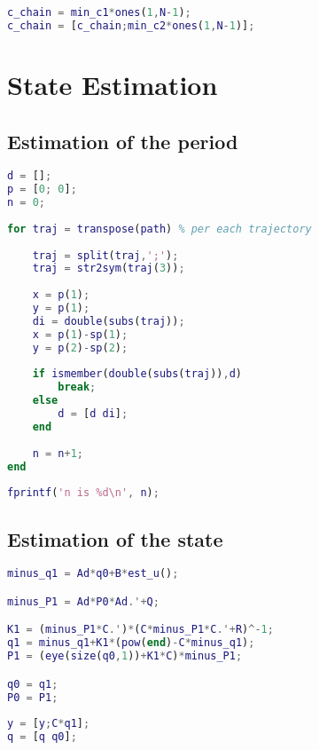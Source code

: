 \begin{lstlisting}[language=Matlab,caption={[Lowest control chain]Implementation of the lowest possible control for benchmarking.},captionpos=b,label=lst:lowest_control]
c_chain = min_c1*ones(1,N-1);
c_chain = [c_chain;min_c2*ones(1,N-1)];
\end{lstlisting}

\section{\color{red}State Estimation}

\subsection{\color{cyan}Estimation of the period}
\label{sec:imp_period_est}

\begin{lstlisting}[language=Matlab,caption={[Estimation of the period]Estimation of the period.},captionpos=b,label=lst:period_est]
% iterating trajectories in the plan to get the constant n (to measure the period)    
d = [];
p = [0; 0];
n = 0;
    
for traj = transpose(path) % per each trajectory
            
    traj = split(traj,';');
    traj = str2sym(traj(3));
        
    x = p(1);
    y = p(1);
    di = double(subs(traj));
    x = p(1)-sp(1);
    y = p(2)-sp(2);
        
    if ismember(double(subs(traj)),d)
        break;
    else
        d = [d di];
    end
        
    n = n+1;
end
    
fprintf('n is %d\n', n);
\end{lstlisting}

\subsection{\color{cyan}Estimation of the state}

\begin{lstlisting}[language=Matlab,caption={[Estimation of the state using Kalman filter]Estimation of the state using Kalman filter.},captionpos=b,label=lst:state_est_kf]
minus_q1 = Ad*q0+B*est_u();

minus_P1 = Ad*P0*Ad.'+Q;

K1 = (minus_P1*C.')*(C*minus_P1*C.'+R)^-1;
q1 = minus_q1+K1*(pow(end)-C*minus_q1);
P1 = (eye(size(q0,1))+K1*C)*minus_P1;

q0 = q1;        
P0 = P1;
            
y = [y;C*q1];    
q = [q q0];
\end{lstlisting}


